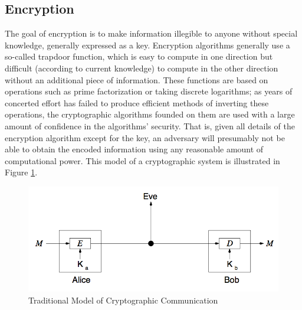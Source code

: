 \documentclass[times, 10pt,twocolumn]{article}
\begin{document}
\subsection{Encryption}
The goal of encryption is to make information illegible to anyone without special knowledge, generally expressed as a key.  Encryption algorithms generally use a so-called trapdoor function, which is easy to compute in one direction but difficult (according to current knowledge) to compute in the other direction without an additional piece of information.  These functions are based on operations such as prime factorization or taking discrete logarithms; as years of concerted effort has failed to produce efficient methods of inverting these operations, the cryptographic algorithms founded on them are used with a large amount of confidence in the algorithms' security.  That is, given all details of the encryption algorithm except for the key, an adversary will presumably not be able to obtain the encoded information using any reasonable amount of computational power.  This model of a cryptographic system is illustrated in Figure \ref{fig:trad_model}.
\begin{figure}[ht]
  \centering
  \includegraphics[scale=.25]{./images/traditional_model.png}
  \caption{Traditional Model of Cryptographic Communication}
  \label{fig:trad_model}
\end{figure}
\end{document}
